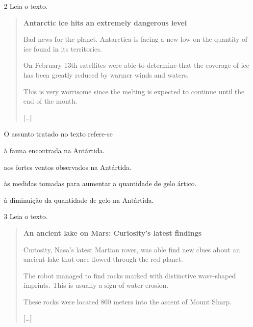 \num{2} Leia o texto.

\begin{quote}
\textbf{Antarctic ice hits an extremely dangerous level}

Bad news for the planet. Antarctica is facing a new low on the quantity of ice found in its territories.

On February 13th satellites were able to determine that the coverage of ice has been greatly reduced by warmer winds and waters.

This is very worrisome since the melting is expected to continue until the end of the month.  

{[}\ldots{}{]}

\end{quote}

O assunto tratado no texto refere-se

\begin{escolha}
\item à fauna encontrada na Antártida.

\item aos fortes ventos observados na Antártida.

\item às medidas tomadas para aumentar a quantidade de gelo ártico.

\item à diminuição da quantidade de gelo na Antártida.
\end{escolha}

\num{3} Leia o texto.

\begin{quote}
\textbf{An ancient lake on Mars: Curiosity's latest findings}

Curiosity, Nasa’s latest Martian rover, was able find new clues about an ancient lake that once flowed through the red planet.

The robot managed to find rocks marked with distinctive wave-shaped imprints. This is usually a sign of water erosion.

These rocks were located 800 meters into the ascent of Mount Sharp.

{[}\ldots{}{]}

\end{quote}

